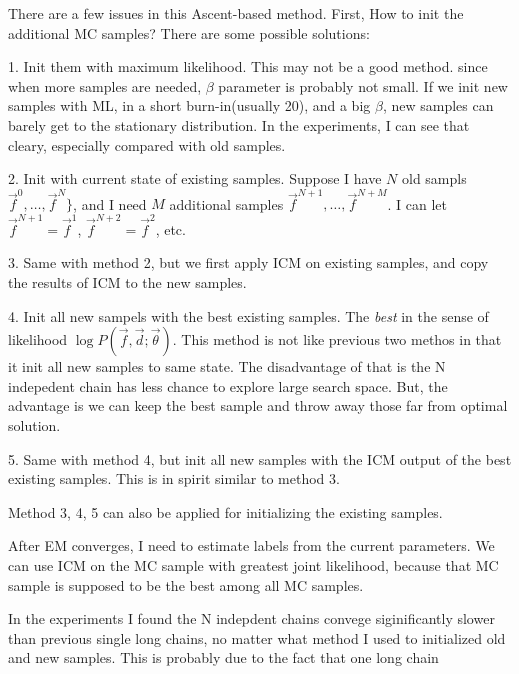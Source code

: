 \documentclass[12pt]{article}
\begin{document}
There are a few issues in this Ascent-based method. First, How to init the additional MC samples? There are some possible solutions:
\begin{itemize*}
\item[1.] Init them with maximum likelihood. This may not be a good method. since when more samples are needed, $\beta$ parameter is probably not small. If we init new samples with ML, in a short burn-in(usually 20), and a big $\beta$, new samples can barely get to the stationary distribution. In the experiments, I can see that cleary, especially compared with old samples.

\item[2. ] Init with current state of existing samples. Suppose I have $N$ old sampls $\vec f^0, \dots, \vec f^N\}$, and I need $M$ additional samples $\vec f^{N+1}, \dots, \vec f^{N+M}$. I can let $\vec f^{N+1} = \vec f^{1}$, $\vec f^{N+2} = \vec f^{2}$, etc.

\item[3. ] Same with method 2, but we first apply ICM on existing samples, and copy the results of ICM to the new samples.

\item[4. ]Init all new sampels with the best existing samples. The \emph{best} in the sense of likelihood $\log P(\vec f, \vec d; \vec \theta)$. This method is not like previous two methos in that it init all new samples to same state. The disadvantage of that is the N indepedent chain has less chance to explore large search space. But, the advantage is we can keep the best sample and throw away those far from optimal solution.

\item[5. ] Same with method 4, but init all new samples with the ICM output of the best existing samples. This is in spirit similar to method 3.
\end{itemize*}

Method 3, 4, 5 can also be applied for initializing the existing samples.

After EM converges, I need to estimate labels from the current parameters. We can use ICM on the MC sample with greatest joint likelihood, because that MC sample is supposed to be the best among all MC samples.

In the experiments I found the N indepdent chains convege siginificantly slower than previous single long chains, no matter what method I used to initialized old and new samples. This is probably due to the fact that one long chain 
\end{document}

